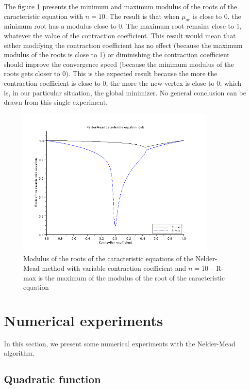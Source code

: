 The figure \ref{fig-nm-roots-variable} presents the minimum
and maximum modulus of the roots of the caracteristic equation
with $n=10$. The result is that when $\mu_{oc}$ is close to 0, the 
minimum root has a modulus close to 0. The maximum root remains close to 
1, whatever the value of the contraction coefficient.
This result would mean that either modifying the contraction
coefficient has no effect (because the maximum modulus of the roots 
is close to 1) or diminishing the contraction coefficient should 
improve the convergence speed (because the minimum modulus of the 
roots gets closer to 0). This is the expected result because
the more the contraction coefficient is close to 0, the more the new 
vertex is close to 0, which is, in our particular situation, the 
global minimizer. No general conclusion can be drawn from this single 
experiment.

\begin{figure}
\begin{center}
\includegraphics[width=10cm]{neldermead-roots-variable.png}
\end{center}
\caption{Modulus of the roots of the caracteristic equations of the Nelder-Mead method with variable 
contraction coefficient and $n=10$ -- R-max is the maximum of the modulus of the root of the 
caracteristic equation}
\label{fig-nm-roots-variable}
\end{figure}

\section{Numerical experiments}

In this section, we present some numerical experiments 
with the Nelder-Mead algorithm.

\subsection{Quadratic function}


